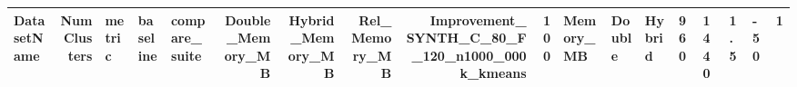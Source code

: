 \begin{tabular}{lrlllrrrrr}
\toprule
DatasetName & NumClusters & metric & baseline & compare_suite & Double_Memory_MB & Hybrid_Memory_MB & Rel_Memory_MB & Improvement_%
\midrule
SYNTH_C_80_F_120_n1000_000k_kmeans & 100 & Memory_MB & Double & Hybrid & 960 & 1440 & 1.5 & -50 & 1 \\
\bottomrule
\end{tabular}
